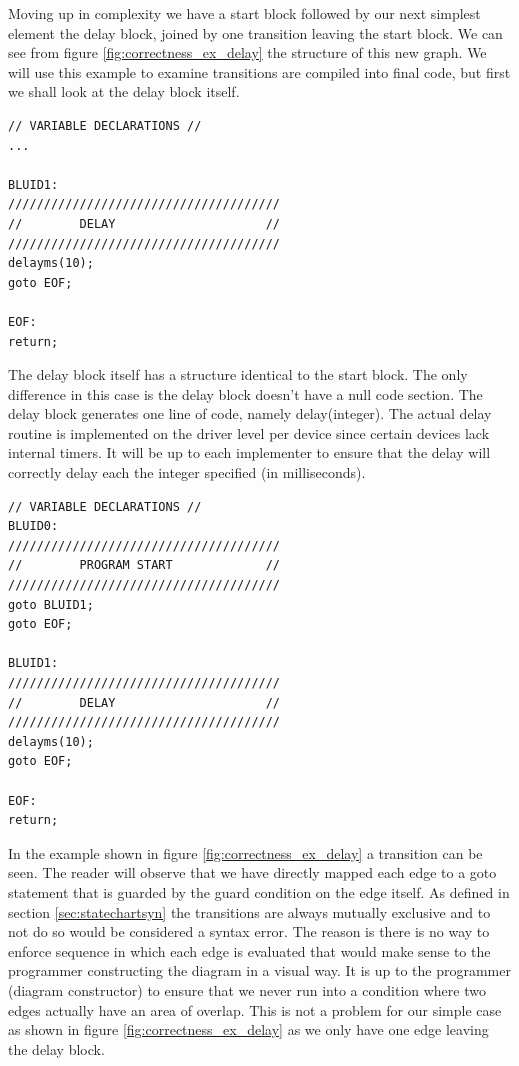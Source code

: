 Moving up in complexity we have a start block followed by our next simplest element the delay block, joined by one transition leaving the start block. We can see from figure \ref{fig:correctness_ex_delay}
the structure of this new graph. We will use this example to examine transitions are compiled into final code, but first we shall look at the delay block itself.

\begin{minipage}{\textwidth}
\begin{lstlisting}[frame=single]
// VARIABLE DECLARATIONS //
...

BLUID1:
//////////////////////////////////////
//        DELAY                     //
//////////////////////////////////////
delayms(10);
goto EOF;

EOF:
return;
\end{lstlisting}
\end{minipage}

The delay block itself has a structure identical to the start block. The only difference in this case is the delay block doesn't have a null code section. The delay block generates one line of code, namely delay(integer). The actual delay routine is implemented on the driver level per device since certain devices lack internal timers. It will be up to each implementer to ensure that the delay will correctly delay each the integer specified (in milliseconds). 

\begin{minipage}{\textwidth}
\begin{lstlisting}[frame=single]
// VARIABLE DECLARATIONS //
BLUID0:
//////////////////////////////////////
//        PROGRAM START             //
//////////////////////////////////////
goto BLUID1;
goto EOF;

BLUID1:
//////////////////////////////////////
//        DELAY                     //
//////////////////////////////////////
delayms(10);
goto EOF;

EOF:
return;
\end{lstlisting}
\end{minipage}

In the example shown in figure \ref{fig:correctness_ex_delay} a transition can be seen. The reader will observe that we have directly mapped each edge to a goto statement that is guarded by the guard condition on the edge itself. As defined in section \ref{sec:statechartsyn} the transitions are always mutually exclusive and to not do so would be considered a syntax error. The reason is there is no way to enforce sequence in which each edge is evaluated that would make sense to the programmer constructing the diagram in a visual way. It is up to the programmer (diagram constructor) to ensure that we never run into a condition where two edges actually have an area of overlap. This is not a problem for our simple case as shown in figure \ref{fig:correctness_ex_delay} as we only have one edge leaving the delay block.

